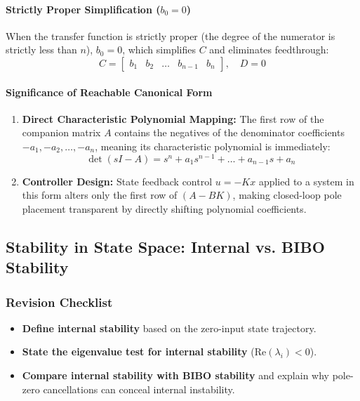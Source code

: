 \documentclass[12pt,onecolumn,twoside ]{article}
\begin{document}
	\paragraph{Strictly Proper Simplification ($b_0 = 0$)}
	When the transfer function is strictly proper (the degree of the numerator is strictly less than $n$), $b_0 = 0$, which simplifies $C$ and eliminates feedthrough: \[
	C = \begin{bmatrix} b_1 & b_2 & \dots & b_{n-1} & b_n \end{bmatrix}, \quad D = 0
	\]
	\paragraph{Significance of Reachable Canonical Form}
	\begin{enumerate}
		\item
		\textbf{Direct Characteristic Polynomial Mapping:} The first row of the companion matrix $A$ contains the negatives of the denominator coefficients $-a_1, -a_2, \dots, -a_n$, meaning its characteristic polynomial is immediately: \[
		\det(sI - A) = s^n + a_1 s^{n-1} + \dots + a_{n-1}s + a_n
		\]
		\item
		\textbf{Controller Design:} State feedback control $u = -Kx$ applied to a system in this form alters only the first row of $(A - BK)$, making closed-loop pole placement transparent by directly shifting polynomial coefficients.
	\end{enumerate}
	
	\subsection{Stability in State Space: Internal vs. BIBO Stability}
	\subsubsection{Revision Checklist}
	\begin{itemize}
		\item[$\square$]
		\textbf{Define internal stability} based on the zero-input state trajectory.
		\item[$\square$]
		\textbf{State the eigenvalue test for internal stability} ($\text{Re}(\lambda_i) < 0$).
		\item[$\square$]
		\textbf{Compare internal stability with BIBO stability} and explain why pole-zero cancellations can conceal internal instability.
	\end{itemize}
	
\end{document}
